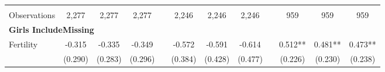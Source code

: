\begin{landscape}
\begin{table}[htpb!]
\begin{center}
\begin{tabular}{lcccp{2mm}cccp{2mm}ccc}
\begin{footnotesize}\end{footnotesize}&\begin{footnotesize}\end{footnotesize}&\begin{footnotesize}\end{footnotesize}&\begin{footnotesize}\end{footnotesize}&\begin{footnotesize}\end{footnotesize}&\begin{footnotesize}\end{footnotesize}&\begin{footnotesize}\end{footnotesize}&\begin{footnotesize}\end{footnotesize}&\begin{footnotesize}\end{footnotesize}&\begin{footnotesize}\end{footnotesize}&\begin{footnotesize}\end{footnotesize}&\begin{footnotesize}\end{footnotesize}\\Observations&2,277&2,277&2,277&&2,246&2,246&2,246&&959&959&959\\
\multicolumn{12}{l}{\textbf{Girls IncludeMissing}}\\ 
Fertility&-0.315&-0.335&-0.349&&-0.572&-0.591&-0.614&&0.512**&0.481**&0.473**\\
&(0.290)&(0.283)&(0.296)&&(0.384)&(0.428)&(0.477)&&(0.226)&(0.230)&(0.238)\\

\end{tabular}
\end{center}
\end{table}
\end{landscape}
